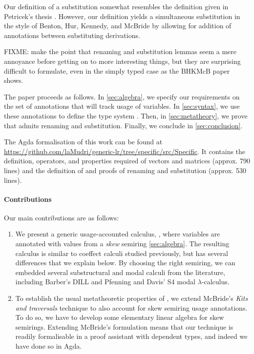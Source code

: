 \documentclass[submission,copyright,creativecommons]{eptcs}
\begin{document}
Our definition of a substitution somewhat resembles the definition given in
Petricek's thesis \cite[p. 137]{petricek-thesis}.
However, our definition yields a simultaneous substitution in the style of
Benton, Hur, Kennedy, and McBride \cite{bhkm12} by allowing for addition of
annotations between substituting derivations.

FIXME: make the point that renaming and substitution lemmas seem a mere annoyance before getting on to more interesting things, but they are surprising difficult to formulate, even in the simply typed case as the BHKMcB paper shows.

The paper proceeds as follows.
In \autoref{sec:algebra}, we specify our requirements on the set of annotations
that will track usage of variables.
In \autoref{sec:syntax}, we use these annotations to define the type system
\name{}.
Then, in \autoref{sec:metatheory}, we prove that \name{} admits renaming and
substitution.
Finally, we conclude in \autoref{sec:conclusion}.

The Agda formalisation of this work can be found at
\url{https://github.com/laMudri/generic-lr/tree/specific/src/Specific}.
It contains the definition, operators, and properties required of vectors and
matrices (approx. 790 lines) and the definition of \name{} and proofs of
renaming and substitution (approx. 530 lines).

\paragraph{Contributions} Our main contributions are as follows:
\begin{enumerate}
\item We present a generic usage-accounted calculus, \name{}, where
  variables are annotated with values from a \emph{skew} semiring
  \autoref{sec:algebra}. The resulting calculus is similar to coeffect
  calculi studied previously, but has several differences that we
  explain below. By choosing the right semiring, we can embedded
  several substructural and modal calculi from the literature,
  including Barber's DILL and Pfenning and Davis' S4 modal
  $\lambda$-calculus.
\item To establish the usual metatheoretic properties of \name{}, we
  extend McBride's \emph{Kits and traversals} technique to also
  account for skew semiring usage annotations. To do so, we have to
  develop some elementary linear algebra for skew semirings. Extending
  McBride's formulation means that our technique is readily
  formalisable in a proof assistant with dependent types, and indeed
  we have done so in Agda.
\end{enumerate}
\end{document}

